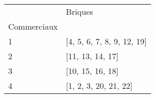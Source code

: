\documentclass[preview]{standalone}
\begin{document}
    \begin{tabular}{ll}
\toprule
 & Briques \\
Commerciaux &  \\
\midrule
1 & [4, 5, 6, 7, 8, 9, 12, 19] \\
2 & [11, 13, 14, 17] \\
3 & [10, 15, 16, 18] \\
4 & [1, 2, 3, 20, 21, 22] \\
\bottomrule
\end{tabular}

    
\end{document}
